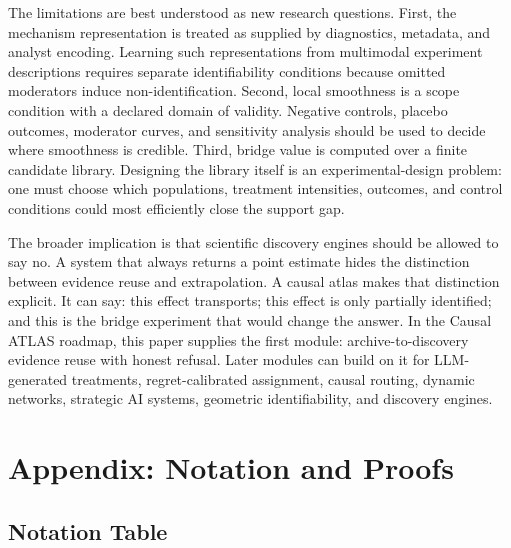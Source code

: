 \documentclass[11pt]{article}
\numberwithin{equation}{section}
\newcommand{\1}{\mathbf 1}
\begin{document}
The limitations are best understood as new research questions.  First, the mechanism representation is treated as supplied by diagnostics, metadata, and analyst encoding.  Learning such representations from multimodal experiment descriptions requires separate identifiability conditions because omitted moderators induce non-identification.  Second, local smoothness is a scope condition with a declared domain of validity.  Negative controls, placebo outcomes, moderator curves, and sensitivity analysis should be used to decide where smoothness is credible.  Third, bridge value is computed over a finite candidate library.  Designing the library itself is an experimental-design problem: one must choose which populations, treatment intensities, outcomes, and control conditions could most efficiently close the support gap.

The broader implication is that scientific discovery engines should be allowed to say no.  A system that always returns a point estimate hides the distinction between evidence reuse and extrapolation.  A causal atlas makes that distinction explicit.  It can say: this effect transports; this effect is only partially identified; and this is the bridge experiment that would change the answer.  In the Causal ATLAS roadmap, this paper supplies the first module: archive-to-discovery evidence reuse with honest refusal.  Later modules can build on it for LLM-generated treatments, regret-calibrated assignment, causal routing, dynamic networks, strategic AI systems, geometric identifiability, and discovery engines.

\appendix

\section{Appendix: Notation and Proofs}
\label{app:proofs}

\subsection{Notation Table}
\end{document}
